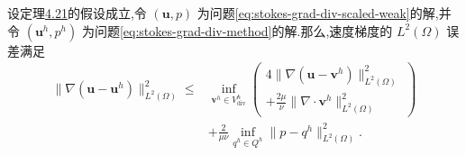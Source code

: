 \begin{theorem}\label{thm:stokes-grad-div-velocity-error}
设定理\hyperref[thm:stokes-error-velocity-h1]{4.21}的假设成立,令 $(\bm{u},p)$ 为问题\cref{eq:stokes-grad-div-scaled-weak}的解,并令 $(\bm{u}^h,p^h)$ 为问题\cref{eq:stokes-grad-div-method}的解.那么,速度梯度的 $L^2(\Omega)$ 误差满足
\begin{equation}\label{eq:stokes-grad-div-velocity-error}
\begin{aligned}
 \|\nabla(\bm{u}-\bm{u}^h)\|_{L^2(\Omega)}^2
 \leq{}&\inf_{\bm{v}^h\in V_{\mathrm{div}}^h}
   \left(\begin{gathered}
     4\|\nabla(\bm{u}-\bm{v}^h)\|_{L^2(\Omega)}^2\\
     +\frac{2\mu}{\nu}\|\nabla\cdot\bm{v}^h\|_{L^2(\Omega)}^2
   \end{gathered}\right)\\
 &+\frac{2}{\mu\nu}
    \inf_{q^h\in Q^h}\|p-q^h\|_{L^2(\Omega)}^2.
\end{aligned}
\end{equation}
\end{theorem}
